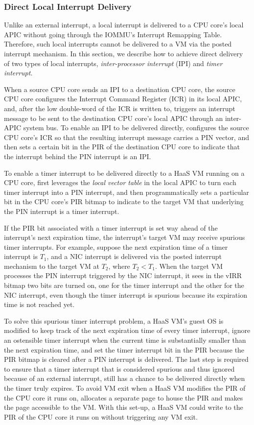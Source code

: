 \subsubsection{Direct Local Interrupt Delivery} \label{subsubsec:shared_pid_dtid}

Unlike an external interrupt, a local interrupt is delivered to a CPU core's local APIC without going through the IOMMU's Interrupt Remapping Table.
Therefore, such local interrupts cannot be delivered to a VM via the posted interrupt mechanism.
In this section, we describe how to achieve direct delivery of two types of local interrupts, {\em inter-processor interrupt} (IPI) and {\em timer interrupt}. 

When a source CPU core sends an IPI to a destination CPU core, the source CPU core configures the Interrupt Command Register (ICR) in its local APIC, 
and, after the low double-word of the ICR is written to, triggers an interrupt message to be sent to the destination CPU core's local APIC through an inter-APIC system bus.
To enable an IPI to be delivered directly, \na configures the source CPU core's ICR so that the resulting interrupt message carries a PIN vector,
and then sets a certain bit in the PIR of the destination CPU core to indicate that the interrupt behind the PIN interrupt is an IPI.
 

To enable a timer interrupt to be delivered directly to a HaaS VM running on a CPU core,
\na first leverages the {\em local vector table} in the local APIC to turn each timer interrupt into a PIN interrupt, and 
then programmatically sets a particular bit in the CPU core's PIR bitmap to indicate to the target VM that underlying the PIN interrupt is a timer interrupt.

If the PIR bit associated with a timer interrupt is set way ahead of the interrupt's next expiration time, 
the interrupt's target VM may receive spurious timer interrupts. 
For example, suppose the next expiration time of a timer interrupt is $T_1$, and a NIC interrupt is delivered via the posted interrupt mechanism to the target VM at $T_2$, where ${T_2} < {T_1}$.
When the target  VM processes the PIN interrupt triggered by the NIC interrupt, it sees in the vIRR bitmap two bits are turned on, one for the timer interrupt and the other for the NIC
interrupt, even though the timer interrupt is spurious because its expiration time is not reached yet.

To solve this spurious timer interrupt problem, a HaaS VM's guest OS is modified to keep track of the next expiration time of every timer interrupt, ignore an ostensible timer interrupt when  
the current time is substantially smaller than the next expiration time, and set the timer interrupt bit in the PIR because the PIR bitmap is cleared after a PIN interrupt is delivered.
The last step is required to ensure that a timer interrupt that is considered spurious and thus ignored because of an external interrupt,  still has a chance to be delivered directly when the timer truly expires.  
To avoid VM exit when a HaaS VM modifies the PIR of the CPU core it runs on, \na allocates a separate page to house the PIR and makes the page accessible to the VM.
With this set-up, a HaaS VM could write to the PIR of the CPU core it runs on without triggering any VM exit.

